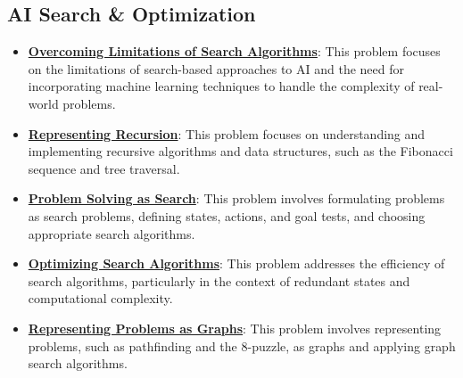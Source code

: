 \documentclass{article}%
\begin{document}
%
\subsection{AI Search \& Optimization}%
\label{subsec:AISearchOptimization}%
\begin{itemize}[leftmargin=*]%
\item \href{https://purdue.brightspace.com/d2l/common/assets/pdfjs-d2l-dist/1.0.14-legacy/web/viewer.html?file=\%2Fcontent\%2Fenforced\%2F1095467-wl.202510.CS.24300.001\%2F02L2-Intro.pdf\%3Fou\%3D1095467\&lang=en-us\&container=d2l-fileviewer-rendered-pdf\&fullscreen=d2l-fileviewer-rendered-pdf-dialog\&height=667#page=12}{\textbf{Overcoming Limitations of Search Algorithms}}: This problem focuses on the limitations of search-based approaches to AI and the need for incorporating machine learning techniques to handle the complexity of real-world problems.%
\item \href{https://purdue.brightspace.com/d2l/common/assets/pdfjs-d2l-dist/1.0.14-legacy/web/viewer.html?file=\%2Fcontent\%2Fenforced\%2F1095467-wl.202510.CS.24300.001\%2F14L1-DepthFS.pdf\%3Fou\%3D1095467\&lang=en-us\&container=d2l-fileviewer-rendered-pdf\&fullscreen=d2l-fileviewer-rendered-pdf-dialog\&height=667#page=3}{\textbf{Representing Recursion}}: This problem focuses on understanding and implementing recursive algorithms and data structures, such as the Fibonacci sequence and tree traversal.%
\item \href{https://purdue.brightspace.com/d2l/common/assets/pdfjs-d2l-dist/1.0.14-legacy/web/viewer.html?file=\%2Fcontent\%2Fenforced\%2F1095467-wl.202510.CS.24300.001\%2F14L1-DepthFS.pdf\%3Fou\%3D1095467\&lang=en-us\&container=d2l-fileviewer-rendered-pdf\&fullscreen=d2l-fileviewer-rendered-pdf-dialog\&height=667#page=14}{\textbf{Problem Solving as Search}}: This problem involves formulating problems as search problems, defining states, actions, and goal tests, and choosing appropriate search algorithms.%
\item \href{https://purdue.brightspace.com/d2l/common/assets/pdfjs-d2l-dist/1.0.14-legacy/web/viewer.html?file=\%2Fcontent\%2Fenforced\%2F1095467-wl.202510.CS.24300.001\%2F14L1-DepthFS.pdf\%3Fou\%3D1095467\&lang=en-us\&container=d2l-fileviewer-rendered-pdf\&fullscreen=d2l-fileviewer-rendered-pdf-dialog\&height=667#page=21}{\textbf{Optimizing Search Algorithms}}: This problem addresses the efficiency of search algorithms, particularly in the context of redundant states and computational complexity.%
\item \href{https://purdue.brightspace.com/d2l/common/assets/pdfjs-d2l-dist/1.0.14-legacy/web/viewer.html?file=\%2Fcontent\%2Fenforced\%2F1095467-wl.202510.CS.24300.001\%2F14L1-DepthFS.pdf\%3Fou\%3D1095467\&lang=en-us\&container=d2l-fileviewer-rendered-pdf\&fullscreen=d2l-fileviewer-rendered-pdf-dialog\&height=667#page=25}{\textbf{Representing Problems as Graphs}}: This problem involves representing problems, such as pathfinding and the 8-puzzle, as graphs and applying graph search algorithms.%

\end{itemize}
\end{document}

